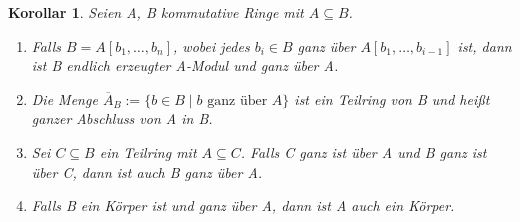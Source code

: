 \documentclass{article}
\newtheorem{korollar}[satz]{Korollar}
\begin{document}
	\begin{korollar} \label{2.1.2}
	Seien A, B kommutative Ringe mit \(A \subseteq B\).
	\begin{enumerate}
	\item\label{2.1.2 a} Falls \(B = A[b_1, \ldots, b_n]\), wobei jedes \(b_i
	\in B\) ganz über \(A[b_1, \ldots, b_{i-1}]\) ist, dann ist B endlich
	erzeugter A-Modul und ganz über A.
	\item Die Menge \(\overline{A}_B := \{b \in B\;|\;b \text{ ganz über } A\}\) ist
	ein Teilring von B und heißt ganzer Abschluss von A in B.
	\item Sei \(C \subseteq B\) ein Teilring mit \(A \subseteq C\). Falls C
	ganz ist über A und B ganz ist über C, dann ist auch B ganz über A.
	\item Falls B ein Körper ist und ganz über A, dann ist A auch ein Körper.
	\end{enumerate}
	\end{korollar}
\end{document}
